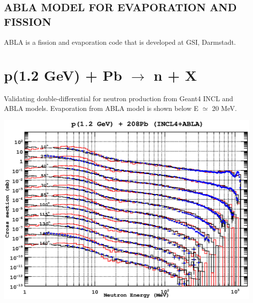 \documentclass[20pt]{article}
\newenvironment{textbox}
{\begin{lrbox}{\dummybox}\begin{minipage}{0.9\columnwidth}}
{\end{minipage}\end{lrbox}\raisebox{-\depth}{\psshadowbox[framesep=1em,framearc=.1,shadow=true]{\usebox{\dummybox}}}\vspace{0.005\textheight}}
\begin{document}
\begin{center}
\begin{multicols}{3}

\begin{textbox}


\section*{{\Huge {\sf ABLA MODEL FOR EVAPO\-RATI\-ON AND FISSION}}}

ABLA is a fission and evaporation code that is developed at GSI, Darmstadt.

\end{textbox}


\section*{{\Huge {\sf p(1.2 GeV) + Pb $\rightarrow$ n + X}}}

Validating double-differential for neutron production from Geant4 INCL
and ABLA models. Evaporation from ABLA model is shown below E $\simeq$
20 MeV.

\includegraphics[scale=0.70]{images/pPbDD.eps}


\end{multicols}
\end{center}
\end{document}

